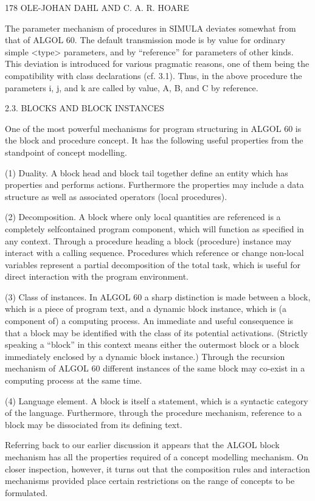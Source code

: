 178 OLE-JOHAN DAHL AND C. A. R. HOARE

The parameter mechanism of procedures in SIMULA deviates somewhat from that of ALGOL 60. The default transmission mode is by value for ordinary simple <type> parameters, and by “reference” for parameters of other kinds. This deviation is introduced for various pragmatic reasons, one of them being the compatibility with class declarations (cf. 3.1). Thus, in the above procedure the parameters i, j, and k are called by value, A, B, and C by reference.

2.3. BLOCKS AND BLOCK INSTANCES

One of the most powerful mechanisms for program structuring in ALGOL 60 is the block and procedure concept. It has the following useful properties from the standpoint of concept modelling.

(1) Duality. A block head and block tail together define an entity which has properties and performs actions. Furthermore the properties may include a data structure as well as associated operators (local procedures).

(2) Decomposition. A block where only local quantities are referenced is a completely selfcontained program component, which will function as specified in any context. Through a procedure heading a block (procedure) instance may interact with a calling sequence. Procedures which reference or change non-local variables represent a partial decomposition of the total task, which is useful for direct interaction with the program environment.

(3) Class of instances. In ALGOL 60 a sharp distinction is made between a block, which is a piece of program text, and a dynamic block instance, which is (a component of) a computing process. An immediate and useful consequence is that a block may be identified with the class of its potential activations. (Strictly speaking a “block” in this context means either the outermost block or a block immediately enclosed by a dynamic block instance.) Through the recursion mechanism of ALGOL 60 different instances of the same block may co-exist in a computing process at the same time.

(4) Language element. A block is itself a statement, which is a syntactic category of the language. Furthermore, through the procedure mechanism, reference to a block may be dissociated from its defining text.

Referring back to our earlier discussion it appears that the ALGOL block mechanism has all the properties required of a concept modelling mechanism. On closer inspection, however, it turns out that the composition rules and interaction mechanisms provided place certain restrictions on the range of concepts to be formulated.


